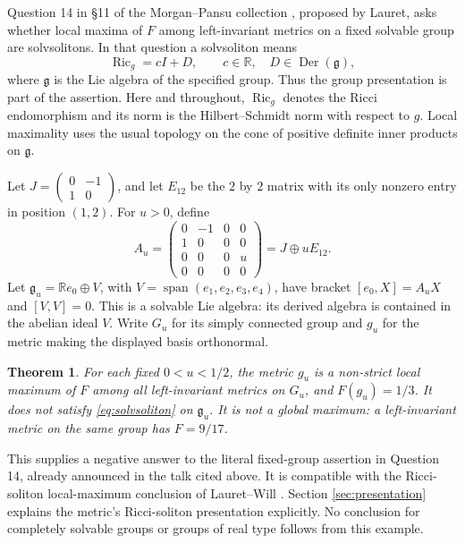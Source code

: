 \documentclass[11pt]{article}
\newtheorem{theorem}{Theorem}
\newcommand{\R}{\mathbb R}
\newcommand{\Ric}{\operatorname{Ric}}
\newcommand{\Der}{\operatorname{Der}}
\begin{document}
Question 14 in \S11 of the Morgan--Pansu collection
\cite[p.~12]{MP}, proposed by Lauret, asks whether local maxima of \(F\)
among left-invariant metrics on a fixed solvable group are
solvsolitons. In that question a solvsoliton means
\begin{equation}\label{eq:solvsoliton}
  \Ric_g=cI+D,\qquad c\in\R,\quad D\in\Der(\mathfrak g),
\end{equation}
where \(\mathfrak g\) is the Lie algebra of the specified group.
Thus the group presentation is part of the assertion.
Here and throughout, \(\Ric_g\) denotes the Ricci endomorphism and its
norm is the Hilbert--Schmidt norm with respect to \(g\).
Local maximality uses the usual topology on the cone of positive
definite inner products on \(\mathfrak g\).

Let \(J=\begin{pmatrix}0&-1\\1&0\end{pmatrix}\), and let \(E_{12}\)
be the \(2\) by \(2\) matrix with its only nonzero entry in position
\((1,2)\). For \(u>0\), define
\[
 A_u=\begin{pmatrix}
 0&-1&0&0\\1&0&0&0\\0&0&0&u\\0&0&0&0
 \end{pmatrix}=J\oplus uE_{12}.
\]
Let \(\mathfrak g_u=\R e_0\oplus V\), with
\(V=\operatorname{span}(e_1,e_2,e_3,e_4)\), have bracket
\([e_0,X]=A_uX\) and \([V,V]=0\).
This is a solvable Lie algebra: its derived algebra is contained in
the abelian ideal \(V\). Write \(G_u\) for its simply connected group
and \(g_u\) for the metric making the displayed basis orthonormal.

\begin{theorem}\label{thm:main}
For each fixed \(0<u<1/2\), the metric \(g_u\) is a non-strict local
maximum of \(F\) among all left-invariant metrics on \(G_u\), and
\(F(g_u)=1/3\). It does not satisfy \eqref{eq:solvsoliton} on
\(\mathfrak g_u\). It is not a global maximum: a left-invariant metric
on the same group has \(F=9/17\).
\end{theorem}

This supplies a negative answer to the literal fixed-group assertion
in Question 14, already announced in the talk cited above.
It is compatible with the Ricci-soliton local-maximum conclusion of
Lauret--Will \cite[Theorem 1.5]{LWv2}.
Section \ref{sec:presentation} explains the metric's Ricci-soliton
presentation explicitly. No conclusion for completely solvable groups
or groups of real type follows from this example.
\end{document}
